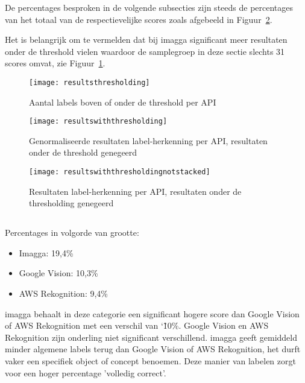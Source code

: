De percentages besproken in de volgende subsecties zijn steeds de percentages van het totaal van de respectievelijke scores zoals afgebeeld in Figuur~\ref{fig:resultswiththresholding}.

Het is belangrijk om te vermelden dat bij imagga significant meer resultaten onder de threshold vielen waardoor de samplegroep in deze sectie slechts 31 scores omvat, zie Figuur~\ref{fig:resultsthresholding}.

\begin{figure}
    \centering    
    \texttt{[image: resultsthresholding]}
    \caption{Aantal labels boven of onder de threshold per API}
    \label{fig:resultsthresholding}
\end{figure}

\begin{figure}
    \centering    
    \texttt{[image: resultswiththresholding]}
    \caption{Genormaliseerde resultaten label-herkenning per API, resultaten onder de threshold genegeerd}
    \label{fig:resultswiththresholding}
\end{figure}

\begin{figure}
    \centering    
    \texttt{[image: resultswiththresholdingnotstacked]}
    \caption{Resultaten label-herkenning per API, resultaten onder de thresholding genegeerd}
    \label{fig:resultswiththresholdingnotstacked}
\end{figure}


\subsection{}
\label{sec:resultaten-volledig-correct}
Percentages in volgorde van grootte:
\begin{itemize}
    \item Imagga: 19,4\%
    \item Google Vision: 10,3\%
    \item AWS Rekognition: 9,4\%
\end{itemize}

imagga behaalt in deze categorie een significant hogere score dan Google Vision of AWS Rekognition met een verschil van \char`\~ 10\%. Google Vision en AWS Rekognition zijn onderling niet significant verschillend.
imagga geeft gemiddeld minder algemene labels terug dan Google Vision of AWS Rekognition, het durft vaker een specifiek object of concept benoemen. Deze manier van labelen zorgt voor een hoger percentage 'volledig correct'.

